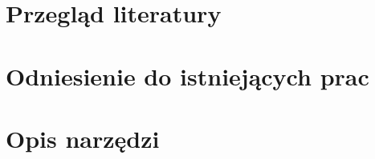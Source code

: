 {  \section{Przegląd literatury}
  {

  }

  \section{Odniesienie do istniejących prac}
  {

  }

  \section{Opis narzędzi}

}